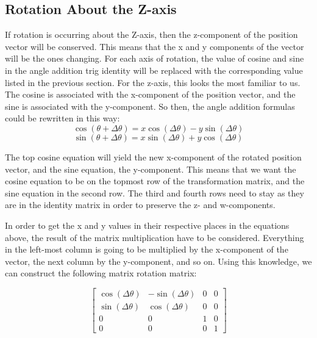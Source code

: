 \documentclass{article}
\begin{document}
	\subsection{Rotation About the Z-axis}

	If rotation is occurring about the Z-axis, then the z-component of the position vector will be conserved. This means that the x and y components of the vector will be the ones changing. For each axis of rotation, the value of cosine and sine in the angle addition trig identity will be replaced with the corresponding value listed in the previous section. For the z-axis, this looks the most familiar to us. The cosine is associated with the x-component of the position vector, and the sine is associated with the y-component. So then, the angle addition formulas could be rewritten in this way:
	\[\cos(\theta + \Delta\theta) = x\cos(\Delta\theta) - y\sin(\Delta\theta)\]
	\[\sin(\theta + \Delta\theta) = x\sin(\Delta\theta) + y\cos(\Delta\theta)\]
	\par
	The top cosine equation will yield the new x-component of the rotated position vector, and the sine equation, the y-component. This means that we want the cosine equation to be on the topmost row of the transformation matrix, and the sine equation in the second row. The third and fourth rows need to stay as they are in the identity matrix in order to preserve the z- and w-components. \par
	In order to get the x and y values in their respective places in the equations above, the result of the matrix multiplication have to be considered. Everything in the left-most column is going to be multiplied by the x-component of the vector, the next column by the y-component, and so on. Using this knowledge, we can construct the following matrix rotation matrix: \par
	\[
		\begin{bmatrix}
			\cos(\Delta\theta) & -\sin(\Delta\theta) & 0 & 0 \\
			\sin(\Delta\theta) &  \cos(\Delta\theta) & 0 & 0 \\
			0 & 0 & 1 & 0 \\
			0 & 0 & 0 & 1
		\end{bmatrix}
	\]
\end{document}
